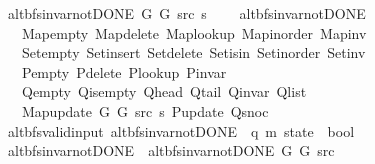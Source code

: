 \begin{isabellebody}
\ \ {\isachardoublequoteopen}alt{\isacharunderscore}{\kern0pt}bfs{\isacharunderscore}{\kern0pt}invar{\isacharunderscore}{\kern0pt}not{\isacharunderscore}{\kern0pt}DONE{\isacharprime}{\kern0pt}\ G{}\ G{}\ src\ s\ {\isasymequiv}\isanewline
\ \ \ alt{\isacharunderscore}{\kern0pt}bfs{\isacharunderscore}{\kern0pt}invar{\isacharunderscore}{\kern0pt}not{\isacharunderscore}{\kern0pt}DONE\isanewline
\ \ \ \ Map{\isacharunderscore}{\kern0pt}empty\ Map{\isacharunderscore}{\kern0pt}delete\ Map{\isacharunderscore}{\kern0pt}lookup\ Map{\isacharunderscore}{\kern0pt}inorder\ Map{\isacharunderscore}{\kern0pt}inv\isanewline
\ \ \ \ Set{\isacharunderscore}{\kern0pt}empty\ Set{\isacharunderscore}{\kern0pt}insert\ Set{\isacharunderscore}{\kern0pt}delete\ Set{\isacharunderscore}{\kern0pt}isin\ Set{\isacharunderscore}{\kern0pt}inorder\ Set{\isacharunderscore}{\kern0pt}inv\isanewline
\ \ \ \ P{\isacharunderscore}{\kern0pt}empty\ P{\isacharunderscore}{\kern0pt}delete\ P{\isacharunderscore}{\kern0pt}lookup\ P{\isacharunderscore}{\kern0pt}invar\isanewline
\ \ \ \ Q{\isacharunderscore}{\kern0pt}empty\ Q{\isacharunderscore}{\kern0pt}is{\isacharunderscore}{\kern0pt}empty\ Q{\isacharunderscore}{\kern0pt}head\ Q{\isacharunderscore}{\kern0pt}tail\ Q{\isacharunderscore}{\kern0pt}invar\ Q{\isacharunderscore}{\kern0pt}list\isanewline
\ \ \ \ Map{\isacharunderscore}{\kern0pt}update\ G{}\ G{}\ src\ s\ P{\isacharunderscore}{\kern0pt}update\ Q{\isacharunderscore}{\kern0pt}snoc{\isachardoublequoteclose}\isanewline
\isanewline
{}\isamarkupfalse%
\ {\isacharparenleft}{\kern0pt}\ alt{\isacharunderscore}{\kern0pt}bfs{\isacharunderscore}{\kern0pt}valid{\isacharunderscore}{\kern0pt}input{\isacharparenright}{\kern0pt}\ alt{\isacharunderscore}{\kern0pt}bfs{\isacharunderscore}{\kern0pt}invar{\isacharunderscore}{\kern0pt}not{\isacharunderscore}{\kern0pt}DONE{\isacharprime}{\kern0pt}{\isacharprime}{\kern0pt}\ {\isacharcolon}{\kern0pt}{\isacharcolon}{\kern0pt}\ {\isachardoublequoteopen}{\isacharparenleft}{\kern0pt}{\isacharprime}{\kern0pt}q{\isacharcomma}{\kern0pt}\ {\isacharprime}{\kern0pt}m{\isacharparenright}{\kern0pt}\ state\ {\isasymRightarrow}\ bool{\isachardoublequoteclose}\ \isanewline
\ \ {\isachardoublequoteopen}alt{\isacharunderscore}{\kern0pt}bfs{\isacharunderscore}{\kern0pt}invar{\isacharunderscore}{\kern0pt}not{\isacharunderscore}{\kern0pt}DONE{\isacharprime}{\kern0pt}{\isacharprime}{\kern0pt}\ {\isasymequiv}\ alt{\isacharunderscore}{\kern0pt}bfs{\isacharunderscore}{\kern0pt}invar{\isacharunderscore}{\kern0pt}not{\isacharunderscore}{\kern0pt}DONE{\isacharprime}{\kern0pt}\ G{}\ G{}\ src{\isachardoublequoteclose}\isanewline

\end{isabellebody}
